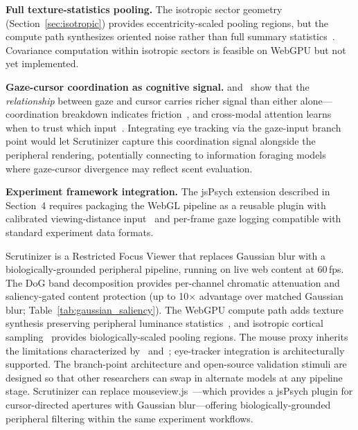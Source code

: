 \documentclass[10pt,twocolumn,letterpaper]{article}
\makeatletter
\renewcommand\section{\@startsection{section}{1}{\z@}{5pt}{2pt}{\normalfont\bfseries\normalsize}}
\makeatother
\begin{document}
\section{Open Problems}

\textbf{Full texture-statistics pooling.} The isotropic sector geometry (Section~\ref{sec:isotropic}) provides eccentricity-scaled pooling regions, but the compute path synthesizes oriented noise rather than full summary statistics~\citep{rosenholtz2012}. Covariance computation within isotropic sectors is feasible on WebGPU but not yet implemented.

\textbf{Gaze-cursor coordination as cognitive signal.} \citet{stone2023} and~\citet{zhu2023} show that the \emph{relationship} between gaze and cursor carries richer signal than either alone---coordination breakdown indicates friction~\citep{stone2023}, and cross-modal attention learns when to trust which input~\citep{zhu2023}. Integrating eye tracking via the gaze-input branch point would let Scrutinizer capture this coordination signal alongside the peripheral rendering, potentially connecting to information foraging models~\citep{pirolli1999} where gaze-cursor divergence may reflect scent evaluation.

\textbf{Experiment framework integration.} The jsPsych extension described in Section~4 requires packaging the WebGL pipeline as a reusable plugin with calibrated viewing-distance input~\citep{remotecalibrator} and per-frame gaze logging compatible with standard experiment data formats.

\section{Conclusion}

Scrutinizer is a Restricted Focus Viewer that replaces Gaussian blur with a biologically-grounded peripheral pipeline, running on live web content at 60\,fps. The DoG band decomposition provides per-channel chromatic attenuation and saliency-gated content protection (up to 10$\times$ advantage over matched Gaussian blur; Table~\ref{tab:gaussian_saliency}). The WebGPU compute path adds texture synthesis preserving peripheral luminance statistics~\citep{freeman2011}, and isotropic cortical sampling~\citep{blauch2026} provides biologically-scaled pooling regions. The mouse proxy inherits the limitations characterized by~\citet{chen2001} and~\citet{huang2012}; eye-tracker integration is architecturally supported. The branch-point architecture and open-source validation stimuli are designed so that other researchers can swap in alternate models at any pipeline stage. Scrutinizer can replace mouseview.js~\citep{anwylirvine2021}---which provides a jsPsych plugin for cursor-directed apertures with Gaussian blur---offering biologically-grounded peripheral filtering within the same experiment workflows.
\end{document}
